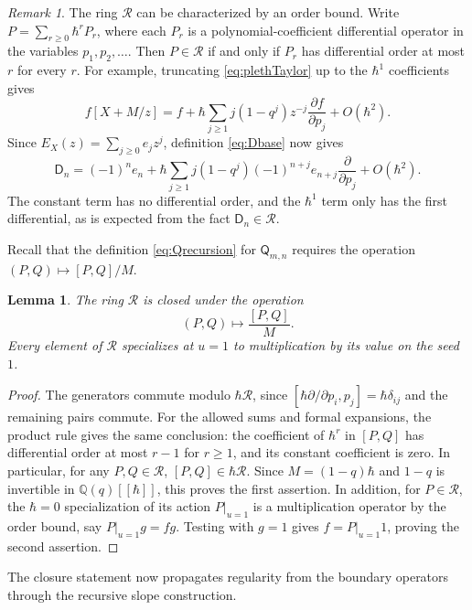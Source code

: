\documentclass[12pt,reqno]{amsart}
\numberwithin{equation}{section}
\newtheorem{lemma}[theorem]{Lemma}
\theoremstyle{definition}
\theoremstyle{remark}
\newtheorem*{remark}{Remark}
\theoremstyle{plain}
\newcommand{\QQ}{\mathbb Q}
\newcommand{\Qop}{\mathsf Q}
\newcommand{\Dop}{\mathsf D}
\begin{document}
\begin{remark}
The ring $\mathscr{R}$ can be characterized by an order bound. Write $P=\sum_{r\geq0}\hbar^rP_r$, where each $P_r$ is a polynomial-coefficient differential operator in the variables $p_1,p_2,\dots$. Then $P\in\mathscr R$ if and only if $P_r$ has differential order at most $r$ for every $r$. For example, truncating \eqref{eq:plethTaylor} up to the $\hbar^1$ coefficients gives
\[
 f[X+M/z]=f+\hbar\sum_{j\ge1}j(1-q^j)z^{-j}
               \frac{\partial f}{\partial p_j}+O(\hbar^2).
\]
Since $E_X(z)=\sum_{j\ge 0}e_j z^j$, definition \eqref{eq:Dbase} now gives
\begin{equation}\label{eq:firstorderD}
 \Dop_n=(-1)^n e_n+
 \hbar\sum_{j\ge1}j(1-q^j)(-1)^{n+j}e_{n+j}
              \frac{\partial}{\partial p_j}+O(\hbar^2).
\end{equation}
The constant term has no differential order, and the $\hbar^1$ term only has the first differential, as is expected from the fact $\Dop_n\in \mathscr{R}$.
\end{remark}

Recall that the definition \eqref{eq:Qrecursion} for $\Qop_{m,n}$ requires the operation $(P,Q)\mapsto [P,Q]/M$. 

\begin{lemma}\label{lem:rees}
The ring $\mathscr R$ is closed under the operation
\[
 (P,Q)\longmapsto\frac{[P,Q]}{M}.
\]
Every element of $\mathscr R$ specializes at $u=1$ to multiplication
by its value on the seed $1$.
\end{lemma}
\begin{proof}
The generators commute modulo $\hbar\mathscr R$, since
$[\hbar\partial/\partial p_i,p_j]=\hbar\delta_{ij}$ and the remaining
pairs commute. For the allowed sums and formal expansions, the
product rule gives the same conclusion: the coefficient of $\hbar^r$
in $[P,Q]$ has differential order at most $r-1$ for $r\ge1$, and its
constant coefficient is zero. In particular, for any $P,Q\in \mathscr R$, $[P,Q]\in \hbar \mathscr R$. Since $M=(1-q)\hbar$ and $1-q$ is invertible in $\QQ(q)[[\hbar]]$, this proves the first assertion. In addition, for $P\in \mathscr R$, the $\hbar=0$ specialization of its action $P|_{u=1}$ is a multiplication operator by the order bound, say $P|_{u=1} g=fg$. Testing with $g=1$ gives $f=P|_{u=1}1$, proving the second assertion.
\end{proof}

The closure statement now propagates regularity from the boundary operators through the recursive slope construction.
\end{document}
